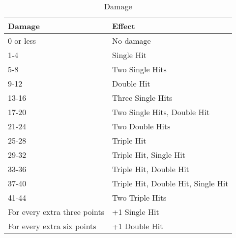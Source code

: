 \begin{table}[H]
  \centering
  \caption{Damage}
  \label{tab:vessel-damage}
  \begin{tabular}{|l|l|}
    \hline
    \textbf{Damage}              & \textbf{Effect}                    \\ \hline
    0 or less                    & No damage                          \\ \hline
    1-4                          & Single Hit                         \\ \hline
    5-8                          & Two Single Hits                    \\ \hline
    9-12                         & Double Hit                         \\ \hline
    13-16                        & Three Single Hits                  \\ \hline
    17-20                        & Two Single Hits, Double Hit        \\ \hline
    21-24                        & Two Double Hits                    \\ \hline
    25-28                        & Triple Hit                         \\ \hline
    29-32                        & Triple Hit, Single Hit             \\ \hline
    33-36                        & Triple Hit, Double Hit             \\ \hline
    37-40                        & Triple Hit, Double Hit, Single Hit \\ \hline
    41-44                        & Two Triple Hits                    \\ \hline
    For every extra three points & +1 Single Hit                      \\ \hline
    For every extra six points   & +1 Double Hit                      \\ \hline
  \end{tabular}
\end{table}

